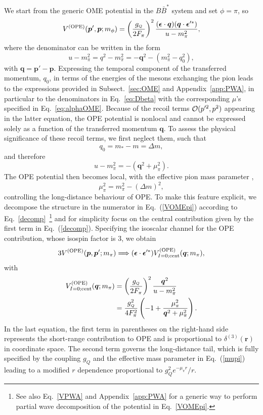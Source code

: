 \documentclass[aps,prd,showpacs,amsmath,twocolumn,superscriptaddress,floatfix,nofootinbib,notitlepage]{revtex4-2}
\newcommand{\vep}{{\bm p}}
\newcommand{\veq}{{\bm q}}
\newcommand{\ver}{{\bm r}}
\newcommand{\be}{\begin{equation}}
\newcommand{\ee}{\end{equation}}
\newcommand{\veep}{{\bm \epsilon}}
\begin{document}
We start from the generic OME potential in the $B\bar{B}^*$ system and set $\phi=\pi$, so
\be
V^{\rm (OPE)}(\vep',\vep;m_\phi)
=\left(\frac{g_{\scriptscriptstyle Q}}{2F_\pi}
\right)^2
\frac{(\veep\cdot \veq)(\veq\cdot {\veep^{\prime *}})}{u-m_\pi^2},
\label{VOMEpi}
\ee
where the denominator can be written in the form
\be
u-m_\pi^2=q^2-m_\pi^2=-\veq^2-\left(m_\pi^2-q_0^2\right),
\ee
with $\veq=\vep'-\vep$. Expressing the temporal component of the transferred momentum, $q_0$, in terms of the energies of the mesons exchanging the pion leads to the expressions provided in Subsect.~\ref{sec:OME} and Appendix~\ref{app:PWA}, in particular to the denominators in Eq.~\eqref{eq:Dbeta} with the corresponding $\mu$'s specified in Eq.~\eqref{eq:alphaOME}. Because of the recoil terms ${\cal O}(p^{\prime 2},p^2)$ appearing in the latter equation, the OPE potential is nonlocal and cannot be expressed solely as a function of the transferred momentum $\veq$. To assess the physical significance of these recoil terms, we first neglect them, such that
\be
q_0=m_*-m=\Delta m,
\ee
and therefore
\be
u-m_\pi^2= -(\veq^2+\mu_\pi^2).
\ee
The OPE potential then becomes local, with the effective pion mass parameter \cite{Tornqvist:1993ng,Swanson:2003tb,Suzuki:2005ha,Thomas:2008ja},
\be
\mu_\pi^2=m_\pi^2-(\Delta m)^2,
\label{mupi}
\ee
controlling the long-distance behaviour of OPE. To make this feature explicit, we decompose the structure in the numerator in Eq.~(\ref{VOMEpi}) according to Eq.~\eqref{decomp}~\cite{Ericson:1988gk}\footnote{See also Eq.~\eqref{VPWA} and Appendix~\ref{app:PWA} for a generic way to perform partial wave decomposition of the potential in Eq.~\eqref{VOMEpi}.}
and for simplicity focus on the central contribution given by the first term in Eq.~(\ref{decomp}). Specifying the isoscalar channel for the OPE contribution, whose isospin factor is 3, we obtain
\be
3V^{\rm (OPE)}(\vep,\vep';m_\pi)\Longrightarrow
(\veep\cdot \veep^{\prime *})V^{\rm (OPE)}_{I=0;{\rm cent}}(\veq;m_\pi),
\ee
with
\be
\begin{split}
V^{\rm (OPE)}_{I=0;{\rm cent}}(\veq;m_\pi)&=\left(\frac{g_{\scriptscriptstyle Q}}{2F_\pi}\right)^2
\frac{\veq^2}{u-m_\pi^2}\\
&=\frac{g_{\scriptscriptstyle Q}^2}{4F_\pi^2}\left(-1+\frac{\mu_\pi^2}{\veq^2+\mu_\pi^2}\right).
\end{split}
\label{VOPE0}
\ee
In the last equation, the first term in parentheses on the right-hand side represents the short-range contribution to OPE and is proportional to $\delta^{(3)}(\ver)$ in coordinate space. The second term governs the long-distance tail, which is fully specified by the coupling $g_{\scriptscriptstyle Q}$ and the effective mass parameter in Eq.~(\ref{mupi})
leading to a modified
$r$ dependence proportional to $g_{\scriptscriptstyle Q}^2e^{-\mu_\pi r}/r$. 
\end{document}
